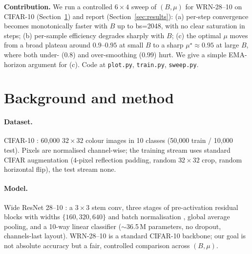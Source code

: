 \documentclass{article}
\begin{document}
\textbf{Contribution.} We run a controlled $6\times4$ sweep of $(B,\mu)$ for WRN-28--10 on CIFAR-10 (Section~\ref{sec:method}) and report (Section~\ref{sec:results}): (a) per-step convergence becomes monotonically faster with $B$ up to bs=2048, with no clear saturation in steps; (b) per-sample efficiency degrades sharply with $B$; (c) the optimal $\mu$ moves from a broad plateau around $0.9$--$0.95$ at small $B$ to a sharp $\mu^{\star}\!\approx\!0.95$ at large $B$, where both under- ($0.8$) and over-smoothing ($0.99$) hurt. We give a simple EMA-horizon argument for (c). Code at \texttt{plot.py}, \texttt{train.py}, \texttt{sweep.py}.

\section{Background and method}
\label{sec:method}

\paragraph{Dataset.} CIFAR-10 \citep{krizhevsky2009cifar}: 60{,}000 $32{\times}32$ colour images in 10 classes (50{,}000 train / 10{,}000 test). Pixels are normalised channel-wise; the training stream uses standard CIFAR augmentation ($4$-pixel reflection padding, random $32{\times}32$ crop, random horizontal flip), the test stream none.

\paragraph{Model.} Wide ResNet 28--10 \citep{zagoruyko2016wide,he2016deep}: a $3{\times}3$ stem conv, three stages of pre-activation residual blocks with widths $\{160, 320, 640\}$ and batch normalisation \citep{ioffe2015batch}, global average pooling, and a 10-way linear classifier ($\sim$36.5\,M parameters, no dropout, channels-last layout). WRN-28--10 is a standard CIFAR-10 backbone; our goal is not absolute accuracy but a fair, controlled comparison across $(B,\mu)$.
\end{document}
